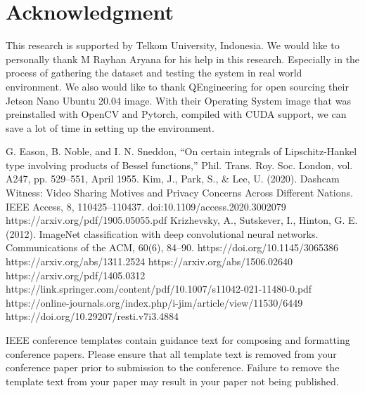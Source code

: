 \documentclass[conference]{IEEEtran}
\begin{document}
\section*{Acknowledgment}
This research is supported by Telkom University, Indonesia.
We would like to personally thank M Rayhan Aryana for his help in this research.
Especially in the process of gathering the dataset and testing the system in real world environment.
We also would like to thank QEngineering for open sourcing their Jetson Nano Ubuntu 20.04 image. With their Operating System image that was preinstalled with OpenCV and Pytorch, compiled with CUDA support, we can save a lot of time in setting up the environment.




\begin{thebibliography}{00}
 G. Eason, B. Noble, and I. N. Sneddon, ``On certain integrals of Lipschitz-Hankel type involving products of Bessel functions,'' Phil. Trans. Roy. Soc. London, vol. A247, pp. 529--551, April 1955.
 Kim, J., Park, S., \& Lee, U. (2020). Dashcam Witness: Video Sharing Motives and Privacy Concerns Across Different Nations. IEEE Access, 8, 110425–110437. doi:10.1109/access.2020.3002079 
 https://arxiv.org/pdf/1905.05055.pdf
 Krizhevsky, A., Sutskever, I., Hinton, G. E. (2012). ImageNet classification with deep convolutional neural networks. Communications of the ACM, 60(6), 84–90. https://doi.org/10.1145/3065386
 https://arxiv.org/abs/1311.2524
 https://arxiv.org/abs/1506.02640
 https://arxiv.org/pdf/1405.0312
 https://link.springer.com/content/pdf/10.1007/s11042-021-11480-0.pdf
 https://online-journals.org/index.php/i-jim/article/view/11530/6449
 https://doi.org/10.29207/resti.v7i3.4884
\end{thebibliography}
\vspace{12pt}
\color{red}
IEEE conference templates contain guidance text for composing and formatting conference papers. Please ensure that all template text is removed from your conference paper prior to submission to the conference. Failure to remove the template text from your paper may result in your paper not being published.
\end{document}
